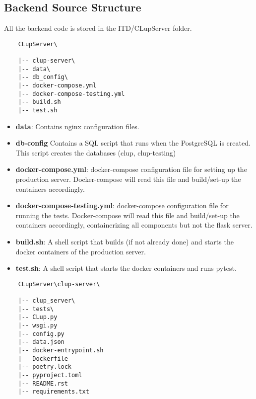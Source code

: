\subsection{Backend Source Structure}
All the backend code is stored in the ITD/CLupServer folder.
\begin{lstlisting}
    CLupServer\

    |-- clup-server\
    |-- data\
    |-- db_config\
    |-- docker-compose.yml
    |-- docker-compose-testing.yml
    |-- build.sh
    |-- test.sh
\end{lstlisting}

\begin{itemize}
    \item \textbf{data}: Contains nginx configuration files.
    \item \textbf{db-config} Contains a SQL script that runs when the PostgreSQL is created. This script creates the databases (clup, clup-testing)
    \item \textbf{docker-compose.yml}: docker-compose configuration file for setting up the production server. Docker-compose will read this file and build/set-up the containers accordingly.
    \item \textbf{docker-compose-testing.yml}: docker-compose configuration file for running the tests. Docker-compose will read this file and build/set-up the containers accordingly, containerizing all components but not the flask server.
    \item \textbf{build.sh}: A shell script that builds (if not already done) and starts the docker containers of the production server.
    \item \textbf{test.sh}: A shell script that starts the docker containers and runs pytest.
\end{itemize}

\clearpage

\begin{lstlisting}
    CLupServer\clup-server\

    |-- clup_server\
    |-- tests\
    |-- CLup.py
    |-- wsgi.py
    |-- config.py
    |-- data.json
    |-- docker-entrypoint.sh
    |-- Dockerfile
    |-- poetry.lock
    |-- pyproject.toml
    |-- README.rst
    |-- requirements.txt


\end{lstlisting}

